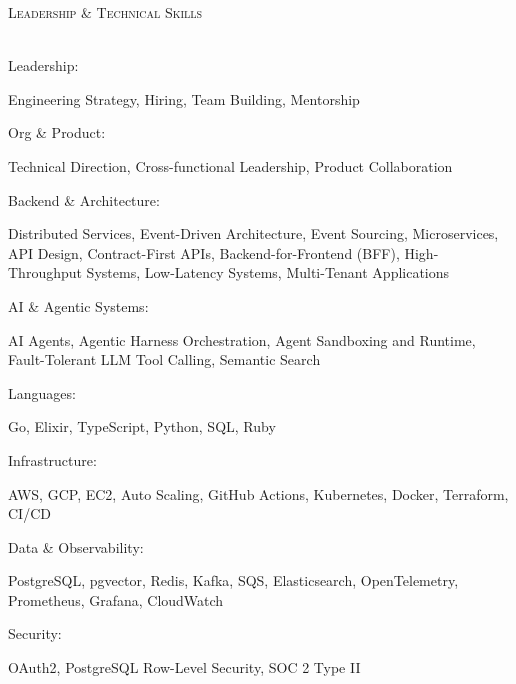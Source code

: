 \documentclass[a4paper]{article}
\newcommand{\lineunder} {
    \vspace*{-8pt} \\
    \hspace*{-18pt} \hrulefill \\
}
\newcommand{\header} [1] {
    {\hspace*{-18pt}\vspace*{6pt} \textsc{#1}}
    \vspace*{-6pt} \lineunder
}
\begin{document}
\header{Leadership \& Technical Skills}
\begingroup
\setlength{\parindent}{0pt}
\noindent\parbox[t]{0.23\textwidth}{\raggedright Leadership:}\hfill\parbox[t]{0.75\textwidth}{\raggedright Engineering Strategy, Hiring, Team Building, Mentorship\par}\par
\vspace{0.35mm}
\noindent\parbox[t]{0.23\textwidth}{\raggedright Org \& Product:}\hfill\parbox[t]{0.75\textwidth}{\raggedright Technical Direction, Cross-functional Leadership, Product Collaboration\par}\par
\vspace{0.35mm}
\noindent\parbox[t]{0.23\textwidth}{\raggedright Backend \& Architecture:}\hfill\parbox[t]{0.75\textwidth}{\raggedright Distributed Services, Event-Driven Architecture, Event Sourcing, Microservices, API Design, Contract-First APIs, Backend-for-Frontend (BFF), High-Throughput Systems, Low-Latency Systems, Multi-Tenant Applications\par}\par
\vspace{0.35mm}
\noindent\parbox[t]{0.23\textwidth}{\raggedright AI \& Agentic Systems:}\hfill\parbox[t]{0.75\textwidth}{\raggedright AI Agents, Agentic Harness Orchestration, Agent Sandboxing and Runtime, Fault-Tolerant LLM Tool Calling, Semantic Search\par}\par
\vspace{0.35mm}
\noindent\parbox[t]{0.23\textwidth}{\raggedright Languages:}\hfill\parbox[t]{0.75\textwidth}{\raggedright Go, Elixir, TypeScript, Python, SQL, Ruby\par}\par
\vspace{0.35mm}
\noindent\parbox[t]{0.23\textwidth}{\raggedright Infrastructure:}\hfill\parbox[t]{0.75\textwidth}{\raggedright AWS, GCP, EC2, Auto Scaling, GitHub Actions, Kubernetes, Docker, Terraform, CI/CD\par}\par
\vspace{0.35mm}
\noindent\parbox[t]{0.23\textwidth}{\raggedright Data \& Observability:}\hfill\parbox[t]{0.75\textwidth}{\raggedright PostgreSQL, pgvector, Redis, Kafka, SQS, Elasticsearch, OpenTelemetry, Prometheus, Grafana, CloudWatch\par}\par
\vspace{0.35mm}
\noindent\parbox[t]{0.23\textwidth}{\raggedright Security:}\hfill\parbox[t]{0.75\textwidth}{\raggedright OAuth2, PostgreSQL Row-Level Security, SOC 2 Type II\par}\par
\endgroup
\vspace{2mm}
\end{document}
